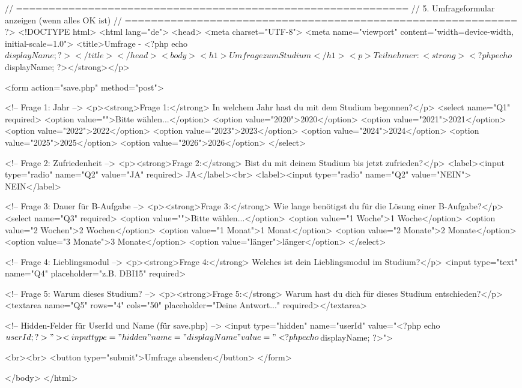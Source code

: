 // ============================================================
// 5. Umfrageformular anzeigen (wenn alles OK ist)
// ============================================================
?>
<!DOCTYPE html>
<html lang="de">
<head>
    <meta charset="UTF-8">
    <meta name="viewport" content="width=device-width, initial-scale=1.0">
    <title>Umfrage - <?php echo $displayName; ?></title>
</head>
<body>

    <h1>Umfrage zum Studium</h1>
    <p>Teilnehmer: <strong><?php echo $displayName; ?></strong></p>

    <form action="save.php" method="post">

        <!-- Frage 1: Jahr -->
        <p><strong>Frage 1:</strong> In welchem Jahr hast du mit dem Studium begonnen?</p>
        <select name="Q1" required>
            <option value="">Bitte wählen...</option>
            <option value="2020">2020</option>
            <option value="2021">2021</option>
            <option value="2022">2022</option>
            <option value="2023">2023</option>
            <option value="2024">2024</option>
            <option value="2025">2025</option>
            <option value="2026">2026</option>
        </select>

        <!-- Frage 2: Zufriedenheit -->
        <p><strong>Frage 2:</strong> Bist du mit deinem Studium bis jetzt zufrieden?</p>
        <label><input type="radio" name="Q2" value="JA" required> JA</label><br>
        <label><input type="radio" name="Q2" value="NEIN"> NEIN</label>

        <!-- Frage 3: Dauer für B-Aufgabe -->
        <p><strong>Frage 3:</strong> Wie lange benötigst du für die Lösung einer B-Aufgabe?</p>
        <select name="Q3" required>
            <option value="">Bitte wählen...</option>
            <option value="1 Woche">1 Woche</option>
            <option value="2 Wochen">2 Wochen</option>
            <option value="1 Monat">1 Monat</option>
            <option value="2 Monate">2 Monate</option>
            <option value="3 Monate">3 Monate</option>
            <option value="länger">länger</option>
        </select>

        <!-- Frage 4: Lieblingsmodul -->
        <p><strong>Frage 4:</strong> Welches ist dein Lieblingsmodul im Studium?</p>
        <input type="text" name="Q4" placeholder="z.B. DBI15" required>

        <!-- Frage 5: Warum dieses Studium? -->
        <p><strong>Frage 5:</strong> Warum hast du dich für dieses Studium entschieden?</p>
        <textarea name="Q5" rows="4" cols="50" placeholder="Deine Antwort..." required></textarea>

        <!-- Hidden-Felder für UserId und Name (für save.php) -->
        <input type="hidden" name="userId" value="<?php echo $userId; ?>">
        <input type="hidden" name="displayName" value="<?php echo $displayName; ?>">

        <br><br>
        <button type="submit">Umfrage absenden</button>
    </form>

</body>
</html>
